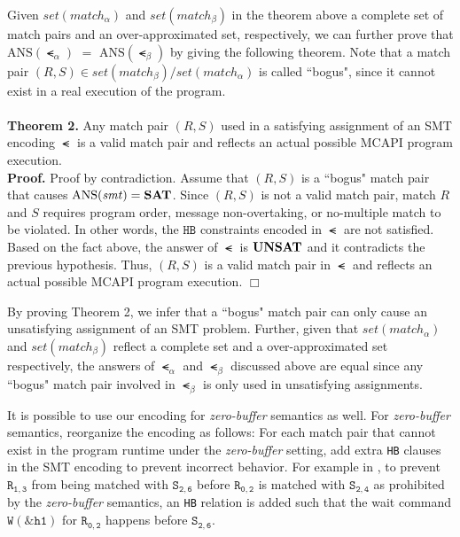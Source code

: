 Given $\mathit{set(match_{\alpha})}$ and $\mathit{set(match_{\beta})}$ in the theorem above a complete set of match pairs and an over-approximated set, respectively, we can further prove that $\mathrm{ANS}(\smt_{\alpha})$ $ = $ $\mathrm{ANS}(\smt_{\beta})$ by giving the following theorem. Note that a match pair $(R, S) \in \mathit{set(match_{\beta})}/\mathit{set(match_{\alpha})}$ is called ``bogus", since it cannot exist in a real execution of the program.
\\
\\
\textbf{Theorem 2.}
Any match pair $(R, S)$ used in a satisfying assignment of an SMT encoding $\smt$ is a valid match pair and reflects an actual possible MCAPI program execution.
\\
\textbf{Proof.}
Proof by contradiction. Assume that $(R, S)$ is a ``bogus" match pair that causes $\mathrm{ANS}(\mathit{smt}) = \textbf{SAT}$. Since $(R, S)$ is not a valid match pair, match $R$ and $S$ requires program order, message non-overtaking, or no-multiple match to be violated. In other words, the $\mathtt{HB}$ constraints encoded in $\smt$ are not satisfied. Based on the fact above, the answer of $\smt$ is $\textbf{UNSAT}$ and it contradicts the previous hypothesis. Thus, $(R, S)$ is a valid match pair in $\smt$ and reflects an actual possible MCAPI program execution. $\Box$


By proving Theorem 2, we infer that a ``bogus" match pair can only cause an unsatisfying assignment of an SMT problem. Further, given that $\mathit{set(match_{\alpha})}$ and $\mathit{set(match_{\beta})}$ reflect a complete set and a over-approximated set respectively, the answers of $\smt_{\alpha}$ and $\smt_{\beta}$ discussed above are equal since any ``bogus" match pair involved in $\smt_{\beta}$ is only used in unsatisfying assignments.

It is possible to use our encoding for \textit{zero-buffer} semantics as well. For \textit{zero-buffer} semantics, reorganize the encoding as follows: For each match pair that cannot exist in the program runtime under the \textit{zero-buffer} setting, add extra \texttt{HB} clauses in the SMT encoding to prevent incorrect behavior. For example in , to prevent $\mathtt{R_{1,3}}$ from being matched with $\mathtt{S_{2,6}}$ before $\mathtt{R_{0,2}}$ is matched with $\mathtt{S_{2,4}}$ as prohibited by the \textit{zero-buffer} semantics, an \texttt{HB} relation is added such that the wait command $\mathtt{W(\&h1)}$ for $\mathtt{R_{0,2}}$ happens before $\mathtt{S_{2,6}}$.













